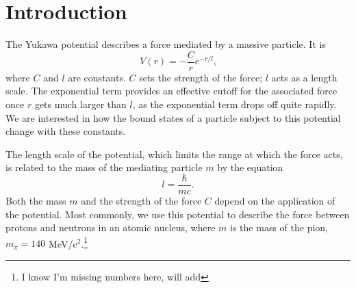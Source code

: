 \documentclass[12pt,twoside]{reedthesis}
\newcommand{\eqn}[1]{\begin{equation}#1\end{equation}}
\begin{document}
  \mainmatter %
  \pagestyle{fancyplain} %


    \chapter*{Introduction}

The Yukawa potential describes a force mediated by a massive particle. It is %
\eqn{
V(r) = -\frac{C}{r}e^{-r/l}\mbox{,}
}
where $C$ and $l$ are constants. $C$ sets the strength of the force; $l$ acts as a length scale. The exponential term provides an effective cutoff for the associated force once $r$ gets much larger than $l$, as the exponential term drops off quite rapidly. We are interested in how the bound states of a particle subject to this potential change with these constants. 

The length scale of the potential, which limits the range at which the force acts, is related to the mass of the mediating particle $m$ by the equation\eqn{
l = \frac{\hbar}{m c}\mbox{.}
}
Both the mass $m$ and the strength of the force $C$ depend on the application of the potential. Most commonly, we use this potential to describe the force between protons and neutrons in an atomic nucleus, where $m$ is the mass of the pion, $m_{\pi} = 140$ MeV/c$^2$.\footnote{I know I'm missing numbers here, will add}
\end{document}
